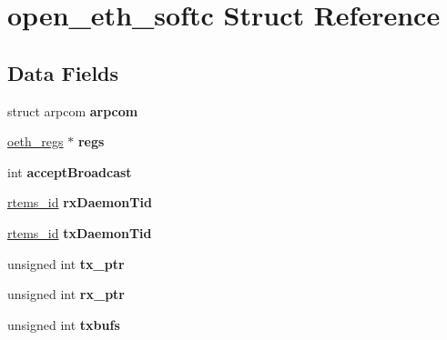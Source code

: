 \hypertarget{structopen__eth__softc}{}\section{open\+\_\+eth\+\_\+softc Struct Reference}
\label{structopen__eth__softc}
\subsection*{Data Fields}
\begin{DoxyCompactItemize}
\item 
\mbox{\label{structopen__eth__softc_ac3cfb795d604074cf10048e807c18d8e}} 
struct arpcom {\bfseries arpcom}
\item 
\mbox{\label{structopen__eth__softc_a318d8b4a757c8d1ae152ef8f0a3bc2d1}} 
\mbox{\hyperlink{struct__oeth__regs}{oeth\+\_\+regs}} $\ast$ {\bfseries regs}
\item 
\mbox{\label{structopen__eth__softc_a36266ce0e7f9afe8ce7d9db2a1e874dd}} 
int {\bfseries accept\+Broadcast}
\item 
\mbox{\label{structopen__eth__softc_afc0a75c91bf6eb38a77e3369784e58d6}} 
\mbox{\hyperlink{group__ClassicTasks_gab20892b814dced7dd4e5b9bf42becd57}{rtems\+\_\+id}} {\bfseries rx\+Daemon\+Tid}
\item 
\mbox{\label{structopen__eth__softc_aead524e4e585984653d963b796d5f57c}} 
\mbox{\hyperlink{group__ClassicTasks_gab20892b814dced7dd4e5b9bf42becd57}{rtems\+\_\+id}} {\bfseries tx\+Daemon\+Tid}
\item 
\mbox{\label{structopen__eth__softc_a414b2ea774d3fd6a0567017733830405}} 
unsigned int {\bfseries tx\+\_\+ptr}
\item 
\mbox{\label{structopen__eth__softc_adcd9afcb284b51d68a5a23e05441d849}} 
unsigned int {\bfseries rx\+\_\+ptr}
\item 
\mbox{\label{structopen__eth__softc_a20aa1edfacff6c9a1929a3a0fab6c918}} 
unsigned int {\bfseries txbufs}
\item 

\end{DoxyCompactItemize}
